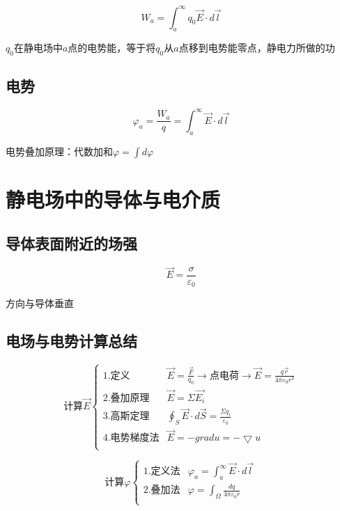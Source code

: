 \documentclass{ctexart}
\begin{document}
$$W_a=\int_{a}^{\infty}q_0\vec{E}\cdot d\vec{l}$$

$q_0$在静电场中$a$点的电势能，等于将$q_0$从$a$点移到电势能零点，静电力所做的功

\subsection{电势}

$$\varphi_a=\frac{W_a}{q}=\int_{a}^{\infty}\vec{E}\cdot d\vec{l}$$

电势叠加原理：代数加和$\varphi=\int d\varphi$

\section{静电场中的导体与电介质}

\subsection{导体表面附近的场强}

$$\vec{E}=\frac{\sigma}{\varepsilon_0}$$

方向与导体垂直

\subsection{电场与电势计算总结}

\begin{equation*}
\text{计算}\vec{E}\begin{cases}
	\text{1.定义}&\vec{E}=\frac{\vec{F}}{q_0} 
	\rightarrow \text{点电荷} \rightarrow 
	\vec{E}=\frac{q\vec{r}}{4\pi \varepsilon_0r^3} \\

	\text{2.叠加原理}&\vec{E}=\Sigma \vec{E_i} \\

	\text{3.高斯定理}&\oint_{S}\vec{E}
	\cdot d\vec{S}=\frac{\Sigma q_i}{\varepsilon_0}\\

	\text{4.电势梯度法}&\vec{E}=-gradu=-\bigtriangledown u\\
\end{cases}
\end{equation*}

\begin{equation*}
	\text{计算}\varphi\begin{cases}
		\text{1.定义法}&\varphi_a=
		\int_{a}^{\infty}\vec{E}\cdot d\vec{l}\\

		\text{2.叠加法}&\varphi=\int_{\Omega}\frac{dq}{4\pi \varepsilon_0r}\\
	\end{cases}
	\end{equation*}
\end{document}
